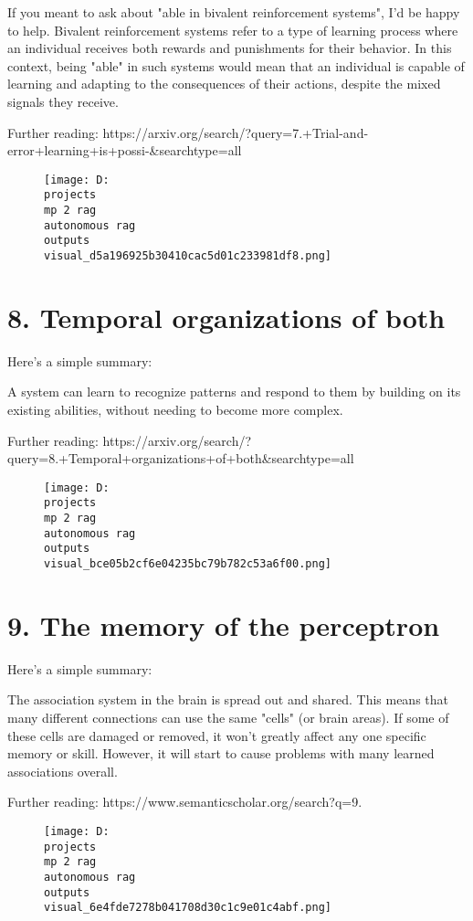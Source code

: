 \documentclass[12pt,a4paper]{article}
\begin{document}
If you meant to ask about "able in bivalent reinforcement systems", I'd be happy to help. Bivalent reinforcement systems refer to a type of learning process where an individual receives both rewards and punishments for their behavior. In this context, being "able" in such systems would mean that an individual is capable of learning and adapting to the consequences of their actions, despite the mixed signals they receive.

Further reading: https://arxiv.org/search/?query=7.+Trial-and-error+learning+is+possi-&searchtype=all
\begin{figure}[h]
\centering
\texttt{[image: D:\\projects\\mp 2 rag\\autonomous rag\\outputs\\visual\_d5a196925b30410cac5d01c233981df8.png]}
\end{figure}
\section{8. Temporal organizations of both}
Here's a simple summary:

A system can learn to recognize patterns and respond to them by building on its existing abilities, without needing to become more complex.

Further reading: https://arxiv.org/search/?query=8.+Temporal+organizations+of+both&searchtype=all
\begin{figure}[h]
\centering
\texttt{[image: D:\\projects\\mp 2 rag\\autonomous rag\\outputs\\visual\_bce05b2cf6e04235bc79b782c53a6f00.png]}
\end{figure}
\section{9. The memory of the perceptron}
Here's a simple summary:

The association system in the brain is spread out and shared. This means that many different connections can use the same "cells" (or brain areas). If some of these cells are damaged or removed, it won't greatly affect any one specific memory or skill. However, it will start to cause problems with many learned associations overall.

Further reading: https://www.semanticscholar.org/search?q=9.%
\begin{figure}[h]
\centering
\texttt{[image: D:\\projects\\mp 2 rag\\autonomous rag\\outputs\\visual\_6e4fde7278b041708d30c1c9e01c4abf.png]}
\end{figure}
\end{document}
